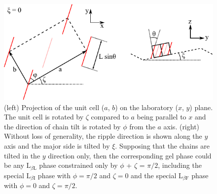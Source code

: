 \begin{figure}[htbp]
  \centering
  \includegraphics[width=\textwidth]{figures/ripple/thin_rod_model/unit_cell_combined}
  \caption[(left) Projection of the unit cell ($a$, $b$) on the laboratory ($x$, $y$) plane]
  {(left) Projection of the unit cell ($a$, $b$) on the laboratory ($x$, $y$) plane.  
  The unit cell is rotated by $\zeta$ compared to $a$ being parallel to $x$ and the 
  direction of chain tilt is rotated by $\phi$ from the $a$ axis. 
  (right) Without loss of generality, the ripple direction is shown along 
  the $y$ axis and the major side is tilted by $\xi$.  Supposing that the chains 
  are tilted in the $y$ direction only, then the corresponding gel phase could 
  be any L$_{\beta\text{L}}$ phase constrained only by 
  $\phi$ + $\zeta$ = $\pi/2$, including the 
  special L$_{\beta\text{I}}$ phase with $\phi=\pi/2$ and $\zeta=0$ and the 
  special L$_{\beta\text{F}}$ phase with $\phi=0$ and $\zeta=\pi/2$.}
  \label{fig:thin_rod_model}
\end{figure}

